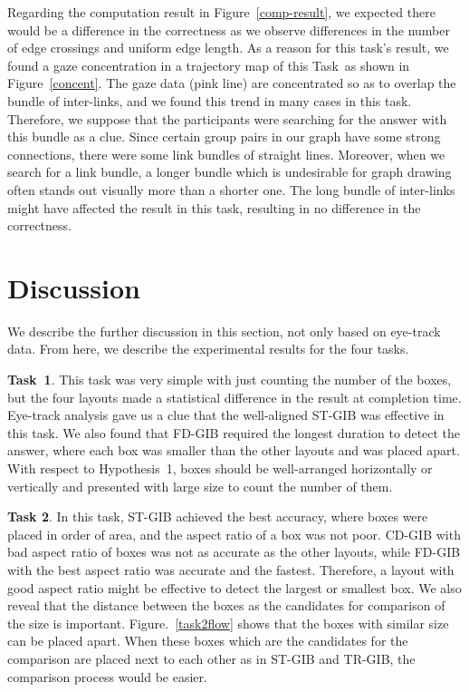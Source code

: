 \documentclass[review]{vgtc}                 %
\begin{document}
Regarding the computation result in Figure~\ref{comp-result}, we expected there would be a difference in the correctness as we observe differences in the number of edge crossings and uniform edge length.
As a reason for this task's result, we found a gaze concentration in a trajectory map of this Task~as shown in Figure~\ref{concent}.
The gaze data (pink line) are concentrated so as to overlap the bundle of inter-links, and we found this trend in many cases in this task.
Therefore, we suppose that the participants were searching for the answer with this bundle as a clue.
Since certain group pairs in our graph have some strong connections, there were some link bundles of straight lines.
Moreover, when we search for a link bundle, a longer bundle which is undesirable for graph drawing often stands out visually more than a shorter one.
The long bundle of inter-links might have affected the result in this task, resulting in no difference in the correctness. 

\section{Discussion}
We describe the further discussion in this section, not only based on eye-track data. From here, we describe the experimental results for the four tasks.

{\bf Task~1}. This task was very simple with just counting the number of the boxes, but the four layouts made a statistical difference in the result at completion time.
Eye-track analysis gave us a clue that the well-aligned ST-GIB was effective in this task.
We also found that FD-GIB required the longest duration to detect the answer, where each box was smaller than the other layouts and was placed apart.
With respect to Hypothesis~1, boxes should be well-arranged horizontally or vertically and presented with large size to count the number of them.

{\bf Task 2}. In this task, ST-GIB achieved the best accuracy, where boxes were placed in order of area, and the aspect ratio of a box was not poor.
CD-GIB with bad aspect ratio of boxes was not as accurate as the other layouts, while FD-GIB with the best aspect ratio was accurate and the fastest.
Therefore, a layout with good aspect ratio might be effective to detect the largest or smallest box.
We also reveal that the distance between the boxes as the candidates for comparison of the size is important.
Figure.~\ref{task2flow} shows that the boxes with similar size can be placed apart.
When these boxes which are the candidates for the comparison are placed next to each other as in ST-GIB and TR-GIB, the comparison process would be easier.
\end{document}
